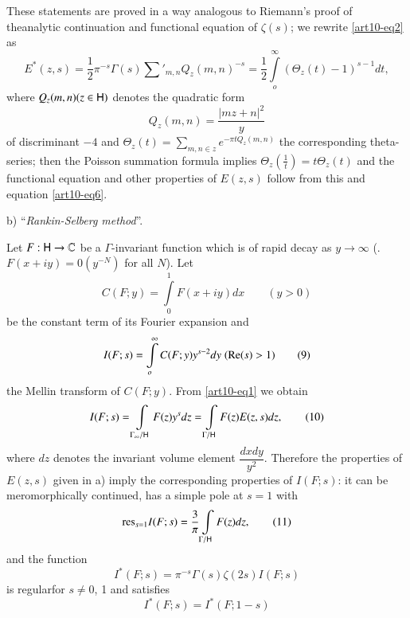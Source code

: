 These statements are proved in a way analogous to Riemann's proof of the\pageoriginale analytic continuation and functional equation of $\zeta(s)$; we rewrite \eqref{art10-eq2} as
\begin{equation*}
E^\ast (z, s) = \frac{1}{2} \pi^{-s}  \Gamma (s) \sum\limits'_{m,n} Q_z (m,n)^{-s} = \frac{1}{2} \int\limits^\infty_{o} (\Theta_z (t) -1)^{s-1} dt, \tag{6}\label{art10-eq6}
\end{equation*}
where $Q_z (m,n) (z \in \mathsf{H})$ denotes the quadratic form 
\begin{equation*}
Q_z (m,n) = \frac{|mz+n|^2}{y } \tag{7} \label{art10-eq7}
\end{equation*}
of discriminant $-4$ and $\Theta_z (t) = \sum\limits_{m,n \in z} e^{-\pi t Q_z(m,n)}$ the corresponding theta-series; then the Poisson summation formula implies $\Theta_z (\frac{1}{t}) = t \Theta_z (t)$ and the functional equation and other properties of $E(z,s)$ follow from this and equation \eqref{art10-eq6}.

b) ``\textit{Rankin-Selberg method}''.

Let $F : \mathsf{H} \to \mathbb{C}$ be a $\Gamma$-invariant function which is of rapid decay as $y \to \infty$ (\ie. $F (x+ iy) = 0(y^{-N})$ for all $N$). Let
\begin{equation*}
C (F; y) = \int\limits^1_0 F (x + iy) d x \qquad (y>0) \tag{8} \label{art10-eq8}
\end{equation*}
be the constant term of its Fourier expansion and 
\begin{equation*}
I (F; s) = \int\limits^\infty_o C (F; y) y^{s-2} dy \; (\operatorname{Re} (s) >1) \tag{9} \label{art10-eq9}
\end{equation*}
the Mellin transform of $C (F; y)$. From \eqref{art10-eq1} we obtain
\begin{equation*}
I(F;s) = \int\limits_{\Gamma_\infty/ \mathsf{H}} F (z) y^s d z = \int\limits_{\Gamma / \mathsf{H}} F (z) E (z,s) dz, \tag{10}\label{art10-eq10}
\end{equation*}
where $dz$ denotes the invariant volume element $\dfrac{dxdy}{y^2}$. Therefore the properties of $E (z,s)$ given in a) imply the corresponding properties of $I(F;s)$: it can be meromorphically continued, has a simple pole at $s =1$ with 
\begin{equation*}
\mathrm{res}_{s=1} I(F;s) = \frac{3}{\pi} \int\limits_{\Gamma/ \mathsf{H}} F (z) d z, \tag{11}\label{art10-eq11}
\end{equation*}
and the function
\begin{equation*}
I^\ast (F;s) = \pi^{-s} \Gamma (s) \zeta (2s) I (F;s)\tag{12}\label{art10-eq12}
\end{equation*}
is regular\pageoriginale for $s \neq 0$, 1 and satisfies 
\begin{equation}
I^\ast (F;s) = I^\ast (F; 1-s) \tag{13}\label{art10-eq13}
\end{equation}

